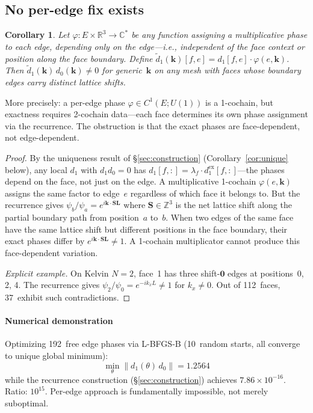 \documentclass[12pt]{article}
\newtheorem{corollary}[theorem]{Corollary}
\theoremstyle{definition}
\theoremstyle{remark}
\newcommand{\RR}{\mathbb{R}}
\newcommand{\ZZ}{\mathbb{Z}}
\newcommand{\CC}{\mathbb{C}}
\newcommand{\kk}{\mathbf{k}}
\newcommand{\LL}{\mathbf{L}}
\begin{document}
\subsection{No per-edge fix exists}

\begin{corollary}\label{cor:noedge}
Let $\varphi\colon E \times \RR^3 \to \CC^*$ be any function assigning a
multiplicative phase to each edge, depending only on the edge---i.e.,
independent of the face context or position along the face boundary.
Define $\tilde{d}_1(\kk)[f,e] = d_1[f,e]\cdot\varphi(e,\kk)$. Then
$\tilde{d}_1(\kk)\,d_0(\kk) \neq 0$ for generic~$\kk$ on any mesh with faces
whose boundary edges carry distinct lattice shifts.
\end{corollary}

More precisely: a per-edge phase $\varphi \in C^1(E; U(1))$ is a 1-cochain,
but exactness requires 2-cochain data---each face determines its own phase
assignment via the recurrence. The obstruction is that the exact phases are
face-dependent, not edge-dependent.

\begin{proof}
By the uniqueness result of \S\ref{sec:construction}
(Corollary~\ref{cor:unique} below), any local $d_1$ with $d_1 d_0 = 0$ has
$d_1[f,:] = \lambda_f \cdot d_1^{\mathrm{ex}}[f,:]$---the phases depend on
the face, not just on the edge. A multiplicative 1-cochain $\varphi(e,\kk)$
assigns the same factor to edge~$e$ regardless of which face it belongs to.
But the recurrence gives $\psi_b/\psi_a = e^{i\kk\cdot\mathbf{S}\LL}$ where
$\mathbf{S} \in \ZZ^3$ is the net lattice shift along the partial boundary
path from position~$a$ to~$b$. When two edges of the same face have the same
lattice shift but different positions in the face boundary, their exact phases
differ by $e^{i\kk\cdot\mathbf{S}\LL} \neq 1$. A 1-cochain multiplicator
cannot produce this face-dependent variation.

\emph{Explicit example.} On Kelvin $N{=}2$, face~1 has three shift-$\mathbf{0}$
edges at positions~0, 2, 4. The recurrence gives
$\psi_2/\psi_0 = e^{-ik_x L} \neq 1$ for $k_x \neq 0$. Out of 112~faces,
37~exhibit such contradictions.
\end{proof}

\paragraph{Numerical demonstration}
Optimizing 192~free edge phases via L-BFGS-B (10~random starts, all converge
to unique global minimum):
\[
  \min_\theta \|d_1(\theta)\,d_0\| = 1.2564
\]
while the recurrence construction (\S\ref{sec:construction}) achieves
$7.86 \times 10^{-16}$. Ratio: $10^{15}$. Per-edge approach is fundamentally
impossible, not merely suboptimal.
\end{document}
